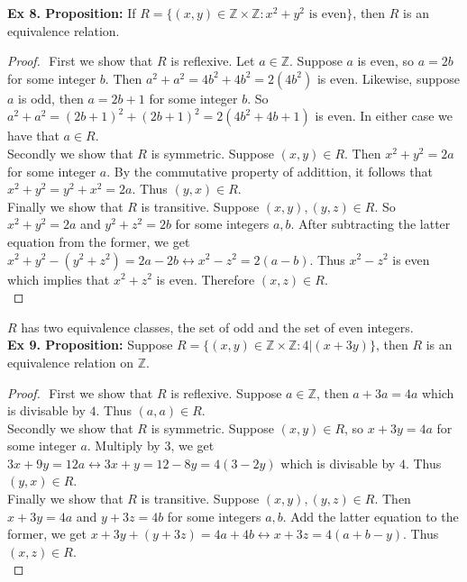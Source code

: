 \documentclass{article}
\begin{document}
\newpage
\noindent \textbf{Ex 8. Proposition:} If $R=\{(x, y) \in \mathbb{Z}\times\mathbb{Z} : x^2 + y^2 \text{ is even}\}$, then $R$ is an equivalence relation.\\
\begin{proof}
$ $\newline
First we show that $R$ is reflexive. Let $a \in \mathbb{Z}$. Suppose $a$ is even, so $a=2b$ for some integer $b$. Then $a^2+a^2=4b^2+4b^2=2(4b^2)$ is even. Likewise, suppose $a$ is odd, then $a=2b+1$ for some integer $b$. So $a^2+a^2=(2b+1)^2+(2b+1)^2=2(4b^2+4b+1)$ is even. In either case we have that $a \in R$.\\

\noindent Secondly we show that $R$ is symmetric. Suppose $(x, y) \in R$. Then $x^2+y^2=2a$ for some integer $a$. By the commutative property of addittion, it follows that $x^2+y^2=y^2+x^2=2a$. Thus $(y, x) \in R$.\\

\noindent Finally we show that $R$ is transitive. Suppose $(x, y), (y,z) \in R$. So $x^2+y^2=2a$ and $y^2+z^2=2b$ for some integers $a, b$. After subtracting the latter equation from the former, we get $x^2+y^2-(y^2+z^2)=2a-2b \leftrightarrow x^2-z^2=2(a-b)$. Thus $x^2-z^2$ is even which implies that $x^2+z^2$ is even. Therefore $(x, z) \in R$.\\
\end{proof}
\noindent $R$ has two equivalence classes, the set of odd and the set of even integers.\\

\noindent \textbf{Ex 9. Proposition:} Suppose $R=\{ (x, y) \in \mathbb{Z} \times \mathbb{Z} : 4|(x+3y) \}$, then $R$ is an equivalence relation on $\mathbb{Z}$.
\begin{proof}
$ $\newline
\noindent First we show that $R$ is reflexive. Suppose $a \in \mathbb{Z}$, then $a+3a=4a$ which is divisable by $4$. Thus $(a,a) \in R$.\\

\noindent Secondly we show that $R$ is symmetric. Suppose $(x, y) \in R$, so $x+3y=4a$ for some integer $a$. Multiply by $3$, we get $3x+9y=12a \leftrightarrow 3x+y=12-8y=4(3-2y)$ which is divisable by $4$. Thus $(y,x) \in R$.\\

\noindent Finally we show that $R$ is transitive. Suppose $(x, y), (y,z) \in R$. Then $x+3y=4a$ and $y+3z=4b$ for some integers $a, b$. Add the latter equation to the former, we get $x+3y+(y+3z)=4a+4b \leftrightarrow x+3z=4(a+b-y)$. Thus $(x,z) \in R$.\\
\end{proof}
\end{document}

